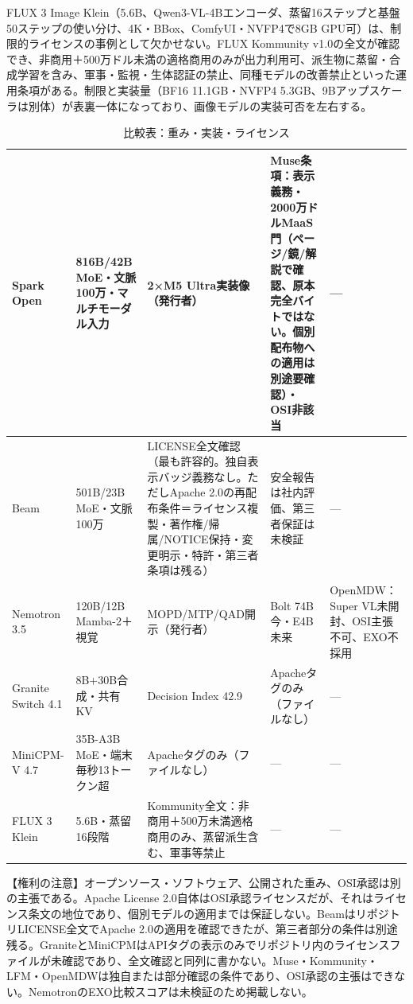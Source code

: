 \documentclass[lualatex,a4paper,10pt]{jlreq}
\begin{document}
FLUX 3 Image Klein（5.6B、Qwen3-VL-4Bエンコーダ、蒸留16ステップと基盤50ステップの使い分け、4K・BBox、ComfyUI・NVFP4で8GB GPU可）は、制限的ライセンスの事例として欠かせない。FLUX Kommunity v1.0の全文が確認でき、非商用＋500万ドル未満の適格商用のみが出力利用可、派生物に蒸留・合成学習を含み、軍事・監視・生体認証の禁止、同種モデルの改善禁止といった運用条項がある。制限と実装量（BF16 11.1GB・NVFP4 5.3GB、9Bアップスケーラは別体）が表裏一体になっており、画像モデルの実装可否を左右する。
\cite{B28,B29,B30}


\begin{table}[htbp]\centering\footnotesize
\caption{比較表：重み・実装・ライセンス}
\begin{tabularx}{0.96\linewidth}{@{}lXXXX@{}}
\toprule
Spark Open & 816B/42B MoE・文脈100万・マルチモーダル入力 & 2×M5 Ultra実装像（発行者） & Muse条項：表示義務・2000万ドルMaaS門（ページ/鏡/解説で確認、原本完全バイトではない。個別配布物への適用は別途要確認）・OSI非該当 & --- \\
\midrule
Beam & 501B/23B MoE・文脈100万 & LICENSE全文確認（最も許容的。独自表示バッジ義務なし。ただしApache 2.0の再配布条件＝ライセンス複製・著作権/帰属/NOTICE保持・変更明示・特許・第三者条項は残る） & 安全報告は社内評価、第三者保証は未検証 & --- \\
\midrule
Nemotron 3.5 & 120B/12B Mamba-2＋視覚 & MOPD/MTP/QAD開示（発行者） & Bolt 74B今・E4B未来 & OpenMDW：Super VL未開封、OSI主張不可、EXO不採用 \\
\midrule
Granite Switch 4.1 & 8B+30B合成・共有KV & Decision Index 42.9 & Apacheタグのみ（ファイルなし） & --- \\
\midrule
MiniCPM-V 4.7 & 35B-A3B MoE・端末毎秒13トークン超 & Apacheタグのみ（ファイルなし） & --- & --- \\
\midrule
FLUX 3 Klein & 5.6B・蒸留16段階 & Kommunity全文：非商用＋500万未満適格商用のみ、蒸留派生含む、軍事等禁止 & --- & --- \\
\bottomrule
\end{tabularx}
\end{table}
\cite{B20,B21,B28,B23,B26,B29,B30,B24,B25,B13,B27,B16,B17,B18,B19,B14,B22,B15}


\begin{tcolorbox}[colback=SurveySoft,colframe=SurveyRule,arc=1mm,boxrule=0.4pt,left=2mm,right=2mm]
【権利の注意】オープンソース・ソフトウェア、公開された重み、OSI承認は別の主張である。Apache License 2.0自体はOSI承認ライセンスだが、それはライセンス条文の地位であり、個別モデルの適用までは保証しない。BeamはリポジトリLICENSE全文でApache 2.0の適用を確認できたが、第三者部分の条件は別途残る。GraniteとMiniCPMはAPIタグの表示のみでリポジトリ内のライセンスファイルが未確認であり、全文確認と同列に書かない。Muse・Kommunity・LFM・OpenMDWは独自または部分確認の条件であり、OSI承認の主張はできない。NemotronのEXO比較スコアは未検証のため掲載しない。
\end{tcolorbox}
\cite{B20,B21,B28,B23,B26,B29,B30,B24,B25,B13,B27,B16,B17,B18,B19,B14,B22,B15}
\end{document}
